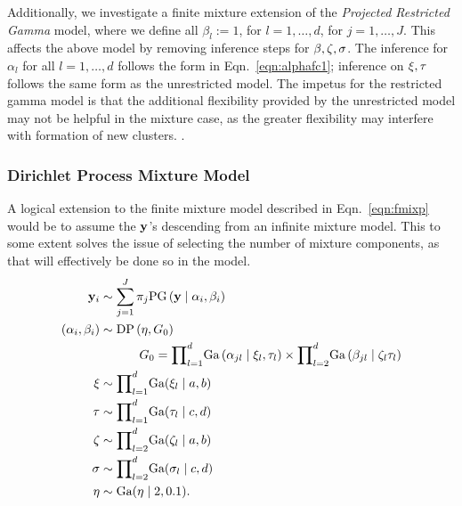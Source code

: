 Additionally, we investigate a finite mixture extension of the \emph{Projected Restricted Gamma} model,
  where we define all $\beta_l := 1$, for $l = 1,\ldots,d$, for $j = 1,\ldots,J$.  This affects the above
  model by removing inference steps for ${\bf \beta},{\bf \zeta},{\bf \sigma}$.  The inference for
  $\alpha_l$ for all $l = 1,\ldots,d$ follows the form in Eqn.~\ref{eqn:alphafc1}; inference on
  ${\bf \xi,\tau}$ follows the same form as the unrestricted model.  The impetus for the restricted
  gamma model is that the additional flexibility provided by the unrestricted model may not be helpful
  in the mixture case, as the greater flexibility may interfere with formation of new clusters.
  .

\subsubsection{Dirichlet Process Mixture Model}
A logical extension to the finite mixture model described in Eqn.~\ref{eqn:fmixp} would be to assume the
  ${\bf y}$'s descending from an infinite mixture model.  This to some extent solves the issue of
  selecting the number of mixture components, as that will effectively be done so in the model.
  \begin{equation}
    \label{eqn:infmixp}
    \begin{aligned}
      {\bf y}_i &\sim \sum_{j = 1}^J\pi_j\text{PG}\left({\bf y}\mid {\bf \alpha}_i, {\bf \beta}_i\right)\\
      (\alpha_i,\beta_i) &\sim \text{DP}\left(\eta, G_0\right)\\
      &~\hspace{1cm}G_0 = {\small\prod}_{l = 1}^d\text{Ga}\left(\alpha_{jl}\mid\xi_{l},\tau_{l}\right)
                    \times{\small\prod}_{l=2}^d\text{Ga}\left(\beta_{jl}\mid\zeta_{l}\tau_{l}\right)\\
      {\bf \xi} &\sim {\small \prod}_{l = 1}^d \text{Ga}(\xi_l\mid a,b)\\
      {\bf \tau} &\sim {\small \prod}_{l = 1}^d \text{Ga}(\tau_l\mid c,d)\\
      {\bf \zeta} &\sim {\small\prod}_{l = 2}^d\text{Ga}(\zeta_l \mid a,b)\\
      {\bf \sigma} &\sim {\small\prod}_{l = 2}^d\text{Ga}(\sigma_l\mid c,d)\\
      {\bf \eta} &\sim \text{Ga}(\eta \mid 2, 0.1).
    \end{aligned}
  \end{equation}
